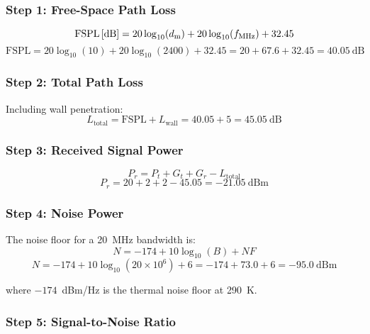 \subsubsection*{Step 1: Free-Space Path Loss}

\begin{equation}
\text{FSPL\,[dB]} = 20\log_{10}(d_{\text{m}}) + 20\log_{10}(f_{\text{MHz}}) + 32.45
\end{equation}
\begin{equation}
\text{FSPL} = 20\log_{10}(10) + 20\log_{10}(2400) + 32.45 = 20 + 67.6 + 32.45 = 40.05~\text{dB}
\end{equation}

\subsubsection*{Step 2: Total Path Loss}

Including wall penetration:
\begin{equation}
L_{\text{total}} = \text{FSPL} + L_{\text{wall}} = 40.05 + 5 = 45.05~\text{dB}
\end{equation}

\subsubsection*{Step 3: Received Signal Power}

\begin{equation}
P_r = P_t + G_t + G_r - L_{\text{total}}
\end{equation}
\begin{equation}
P_r = 20 + 2 + 2 - 45.05 = -21.05~\text{dBm}
\end{equation}

\subsubsection*{Step 4: Noise Power}

The noise floor for a 20~MHz bandwidth is:
\begin{equation}
N = -174 + 10\log_{10}(B) + NF
\end{equation}
\begin{equation}
N = -174 + 10\log_{10}(20 \times 10^6) + 6 = -174 + 73.0 + 6 = -95.0~\text{dBm}
\end{equation}

where $-174$~dBm/Hz is the thermal noise floor at 290~K.

\subsubsection*{Step 5: Signal-to-Noise Ratio}

